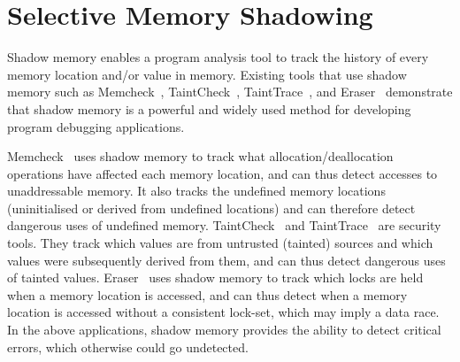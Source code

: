 


\section{Selective Memory Shadowing\label{sec:uninitialised_memory}}

Shadow memory enables a program analysis tool to track the history of every memory location and/or value in memory. Existing tools that use shadow memory such as Memcheck~\cite{Memcheck}, TaintCheck~\cite{NewsomeS05}, TaintTrace~\cite{Cheng:2006:TEF:1157733.1157903}, and Eraser~\cite{Savage:1997:EDD:265924.265927} demonstrate that shadow memory is a powerful and widely used method for developing program debugging applications. 


Memcheck~\cite{Memcheck} uses shadow memory to track what allocation/deallocation operations have affected each memory location, and can thus detect accesses to unaddressable memory. It also tracks the undefined memory locations (uninitialised or derived from undefined locations) and can therefore detect dangerous uses of undefined memory. TaintCheck~\cite{NewsomeS05} and TaintTrace~\cite{Cheng:2006:TEF:1157733.1157903} are security tools. They track which values are from untrusted (tainted) sources and which values were subsequently derived from them, and can thus detect dangerous uses of tainted values.
Eraser~\cite{Savage:1997:EDD:265924.265927} uses shadow memory to track which locks are held when a memory location is accessed, and can thus detect when a memory location is accessed without a consistent lock-set, which may imply a data race. In the above applications, shadow memory provides the ability to detect critical errors, which otherwise could go undetected.

